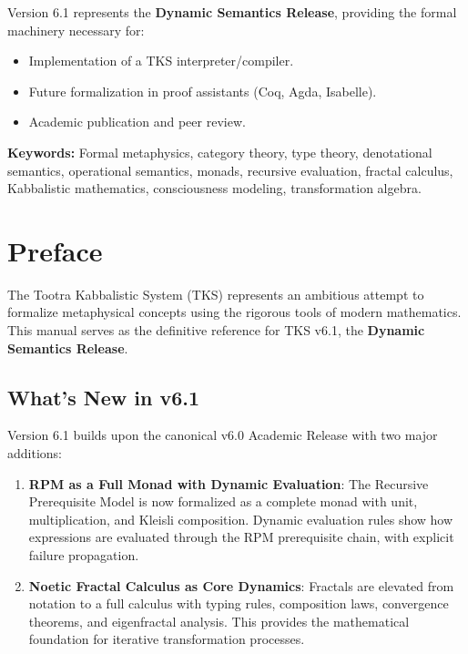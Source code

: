 \documentclass[11pt,twoside,openright]{book}
\theoremstyle{definition}
\theoremstyle{plain}
\theoremstyle{remark}
\begin{document}
Version 6.1 represents the \textbf{Dynamic Semantics Release}, providing the formal machinery necessary for:
\begin{itemize}
  \item Implementation of a TKS interpreter/compiler.
  \item Future formalization in proof assistants (Coq, Agda, Isabelle).
  \item Academic publication and peer review.
\end{itemize}

\vspace{1em}
\noindent\textbf{Keywords:} Formal metaphysics, category theory, type theory, denotational semantics, operational semantics, monads, recursive evaluation, fractal calculus, Kabbalistic mathematics, consciousness modeling, transformation algebra.

\tableofcontents

\chapter*{Preface}

The Tootra Kabbalistic System (TKS) represents an ambitious attempt to formalize metaphysical concepts using the rigorous tools of modern mathematics. This manual serves as the definitive reference for TKS v6.1, the \textbf{Dynamic Semantics Release}.

\section*{What's New in v6.1}

Version 6.1 builds upon the canonical v6.0 Academic Release with two major additions:

\begin{enumerate}
  \item \textbf{RPM as a Full Monad with Dynamic Evaluation}: The Recursive Prerequisite Model is now formalized as a complete monad with unit, multiplication, and Kleisli composition. Dynamic evaluation rules show how expressions are evaluated through the RPM prerequisite chain, with explicit failure propagation.

  \item \textbf{Noetic Fractal Calculus as Core Dynamics}: Fractals are elevated from notation to a full calculus with typing rules, composition laws, convergence theorems, and eigenfractal analysis. This provides the mathematical foundation for iterative transformation processes.
\end{enumerate}
\end{document}
